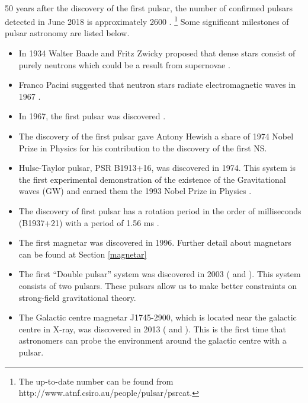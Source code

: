 \documentclass[thesis_msc.tex]{subfiles}
\begin{document}
    \paragraph{} 50 years after the discovery of the first pulsar, the number of confirmed pulsars detected in June 2018 is approximately 2600 \citep{PSRCAT2}. \footnote{The up-to-date number can be found from http://www.atnf.csiro.au/people/pulsar/psrcat.} Some significant milestones of pulsar astronomy are listed below.

\begin{itemize}
\item In 1934 Walter Baade and Fritz Zwicky proposed that dense stars consist of purely neutrons which could be a result from supernovae  \citep{baade1934remarks}.

\item Franco Pacini suggested that neutron stars radiate electromagnetic waves in 1967 \citep{PACINI1967}. 
\item In 1967, the first pulsar was discovered \citep{HEWISH1968}.

\item The discovery of the first pulsar gave  Antony Hewish a share of 1974 Nobel Prize in Physics \citep{HEWISH1968} for his contribution to the discovery of the first NS.

\item Hulse-Taylor pulsar, PSR B1913+16,  was discovered in 1974. This system is the first experimental demonstration of the existence of the Gravitational waves (GW) and earned them the 1993 Nobel Prize in Physics \citep{hulse1975discovery}.

\item The discovery of first pulsar has a rotation period in the order of milliseconds  (B1937+21) with a period of 1.56 ms \citep{backer1982millisecond}. 

\item The first magnetar \citep{kouveliotou1998x} was discovered in 1996. Further detail about magnetars can be found at Section \ref{magnetar}

\item The first ``Double pulsar'' system was discovered in 2003 (\cite{burgay2003increased} and \cite{lyne2004double}). This system  consists of two pulsars. These pulsars allow us to make better constraints on strong-field gravitational theory.


\item The Galactic centre magnetar J1745-2900, which is located near the galactic centre in X-ray, was discovered in 2013 (\cite{kennea2013swift} and \cite{eatough2013strong}). This is the first time that astronomers can probe the environment around the galactic centre with a pulsar.  

\end{itemize}
\end{document}
